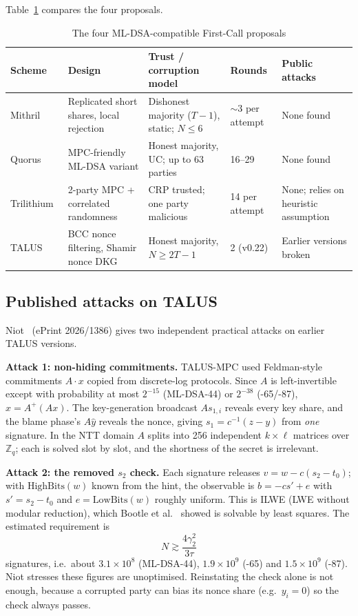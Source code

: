\documentclass[10pt,conference,a4paper]{IEEEtran}
\newcommand{\HB}{\mathrm{HighBits}}
\newcommand{\LB}{\mathrm{LowBits}}
\begin{document}
Table~\ref{tab:schemes} compares the four proposals.

\begin{table}[t]
\caption{The four ML-DSA-compatible First-Call proposals}\label{tab:schemes}
\centering\footnotesize
\begin{tabularx}{\textwidth}{@{}lXXlX@{}}
\toprule
Scheme & Design & Trust / corruption model & Rounds & Public attacks\\
\midrule
Mithril~\cite{mithril} & Replicated short shares, local rejection & Dishonest majority ($T-1$), static; $N\le6$ & $\sim$3 per attempt & None found\\
Quorus~\cite{quorus} & MPC-friendly ML-DSA variant & Honest majority, UC; up to 63 parties & 16--29 & None found\\
Trilithium~\cite{trilithium} & 2-party MPC + correlated randomness & CRP trusted; one party malicious & 14 per attempt & None; relies on heuristic assumption\\
TALUS~\cite{talus,taluspw} & BCC nonce filtering, Shamir nonce DKG & Honest majority, $N\ge 2T-1$ & 2 (v0.22) & Earlier versions broken~\cite{niot}\\
\bottomrule
\end{tabularx}
\end{table}

\subsection{Published attacks on TALUS}\label{sec:attacks}
Niot~\cite{niot} (ePrint 2026/1386) gives two independent practical attacks on earlier TALUS versions.

\textbf{Attack 1: non-hiding commitments.} TALUS-MPC used Feldman-style commitments $A\cdot x$ copied from discrete-log
protocols. Since $A$ is left-invertible except with probability at most $2^{-15}$ (ML-DSA-44) or $2^{-38}$ (-65/-87),
$x=A^{+}(Ax)$. The key-generation broadcast $As_{1,i}$ reveals every key share, and the blame phase's $A\hat y$ reveals the
nonce, giving $s_1=c^{-1}(z-y)$ from \emph{one} signature. In the NTT domain $A$ splits into 256 independent $k\times\ell$
matrices over $\mathbb{Z}_q$; each is solved slot by slot, and the shortness of the secret is irrelevant.

\textbf{Attack 2: the removed $s_2$ check.} Each signature releases $v=w-c(s_2-t_0)$; with $\HB(w)$ known from the hint,
the observable is $b=-cs'+e$ with $s'=s_2-t_0$ and $e=\LB(w)$ roughly uniform. This is ILWE (LWE without modular
reduction), which Bootle et al.~\cite{ilwe} showed is solvable by least squares. The estimated requirement is
\begin{equation}
N \gtrsim \frac{4\gamma_2^2}{3\tau}\label{eq:ilwe}
\end{equation}
signatures, i.e.\ about $3.1\times10^8$ (ML-DSA-44), $1.9\times10^9$ (-65) and $1.5\times10^9$ (-87). Niot stresses these
figures are unoptimised. Reinstating the check alone is not enough, because a corrupted party can bias its nonce share
(e.g.\ $y_i=0$) so the check always passes.
\end{document}
